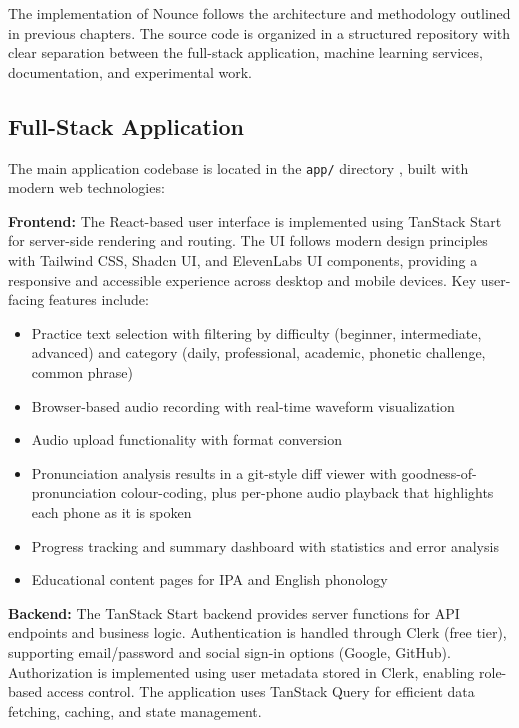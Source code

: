 \documentclass[a4paper,12pt]{report}
\begin{document}
The implementation of Nounce follows the architecture and methodology outlined in previous chapters. The source code is organized in a structured repository \cite{github2024senior} with clear separation between the full-stack application, machine learning services, documentation, and experimental work.

\subsection{Full-Stack Application}

The main application codebase is located in the \texttt{app/} directory \cite{github2024app}, built with modern web technologies:

\textbf{Frontend:} The React-based user interface is implemented using TanStack Start for server-side rendering and routing. The UI follows modern design principles with Tailwind CSS, Shadcn UI, and ElevenLabs UI components, providing a responsive and accessible experience across desktop and mobile devices. Key user-facing features include:
\begin{itemize}
    \item Practice text selection with filtering by difficulty (beginner, intermediate, advanced) and category (daily, professional, academic, phonetic challenge, common phrase)
    \item Browser-based audio recording with real-time waveform visualization
    \item Audio upload functionality with format conversion
    \item Pronunciation analysis results in a git-style diff viewer with goodness-of-pronunciation colour-coding, plus per-phone audio playback that highlights each phone as it is spoken
    \item Progress tracking and summary dashboard with statistics and error analysis
    \item Educational content pages for IPA and English phonology
\end{itemize}

\textbf{Backend:} The TanStack Start backend provides server functions for API endpoints and business logic. Authentication is handled through Clerk (free tier), supporting email/password and social sign-in options (Google, GitHub). Authorization is implemented using user metadata stored in Clerk, enabling role-based access control. The application uses TanStack Query for efficient data fetching, caching, and state management.
\end{document}
